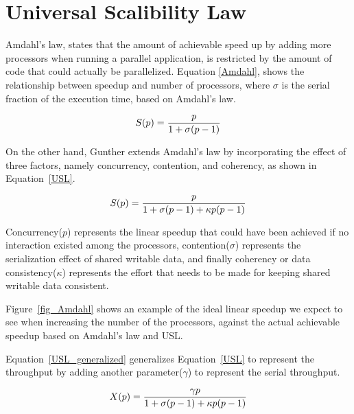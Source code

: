 \vspace{\baselineskip}
\section{Universal Scalibility Law}
Amdahl's law\cite{amdahl1967validity}, states that the amount of achievable speed up by adding more processors when running a parallel application, is restricted by the amount of code that could actually be parallelized. 
Equation \ref{Amdahl}, shows the relationship between speedup and number of processors, where $\sigma$ is the serial fraction of the execution time, based on Amdahl's law\cite{gunther2007guerrilla}. 

\begin{equation}\label{Amdahl}
S(p) = \frac{p}{1+\sigma(p-1)}\\
\end{equation}

On the other hand, Gunther\cite{gunther2007guerrilla} extends Amdahl's law by incorporating the effect of three factors, namely concurrency, contention, and coherency, as shown in Equation~\ref{USL}.

\begin{equation}\label{USL}
S(p) = \frac{p}{1+\sigma(p-1)+\kappa{p}(p-1)}\\
\end{equation}

Concurrency($p$) represents the linear speedup that could have been achieved if no interaction existed among the processors, contention($\sigma$) represents the serialization effect of shared writable data, and finally coherency or data consistency($\kappa$) represents the effort that needs to be made for keeping shared writable data consistent\cite{gunther2007guerrilla}.    

Figure~\ref{fig_Amdahl} shows an example of the ideal linear speedup we expect to see when increasing the number of the processors, against the actual achievable speedup based on Amdahl's law and USL.

Equation~\ref{USL_generalized} generalizes Equation~\ref{USL} to represent the throughput by adding another parameter($\gamma$) to represent the serial throughput.

\begin{equation}\label{USL_generalized}
X(p) = \frac{\gamma{p}}{1+\sigma(p-1)+\kappa{p}(p-1)}\\
\end{equation}


